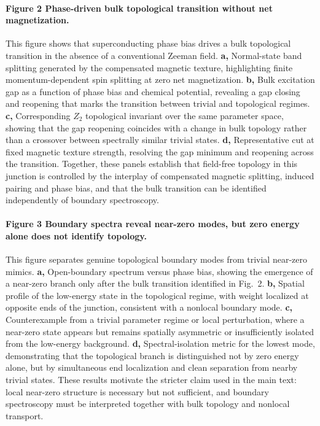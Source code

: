 \paragraph{Figure 2 \textbar{} Phase-driven bulk topological transition without net magnetization.}
This figure shows that superconducting phase bias drives a bulk topological transition in the absence of a conventional Zeeman field. \textbf{a,} Normal-state band splitting generated by the compensated magnetic texture, highlighting finite momentum-dependent spin splitting at zero net magnetization. \textbf{b,} Bulk excitation gap as a function of phase bias and chemical potential, revealing a gap closing and reopening that marks the transition between trivial and topological regimes. \textbf{c,} Corresponding $Z_2$ topological invariant over the same parameter space, showing that the gap reopening coincides with a change in bulk topology rather than a crossover between spectrally similar trivial states. \textbf{d,} Representative cut at fixed magnetic texture strength, resolving the gap minimum and reopening across the transition. Together, these panels establish that field-free topology in this junction is controlled by the interplay of compensated magnetic splitting, induced pairing and phase bias, and that the bulk transition can be identified independently of boundary spectroscopy.

\paragraph{Figure 3 \textbar{} Boundary spectra reveal near-zero modes, but zero energy alone does not identify topology.}
This figure separates genuine topological boundary modes from trivial near-zero mimics. \textbf{a,} Open-boundary spectrum versus phase bias, showing the emergence of a near-zero branch only after the bulk transition identified in Fig.~2. \textbf{b,} Spatial profile of the low-energy state in the topological regime, with weight localized at opposite ends of the junction, consistent with a nonlocal boundary mode. \textbf{c,} Counterexample from a trivial parameter regime or local perturbation, where a near-zero state appears but remains spatially asymmetric or insufficiently isolated from the low-energy background. \textbf{d,} Spectral-isolation metric for the lowest mode, demonstrating that the topological branch is distinguished not by zero energy alone, but by simultaneous end localization and clean separation from nearby trivial states. These results motivate the stricter claim used in the main text: local near-zero structure is necessary but not sufficient, and boundary spectroscopy must be interpreted together with bulk topology and nonlocal transport.


